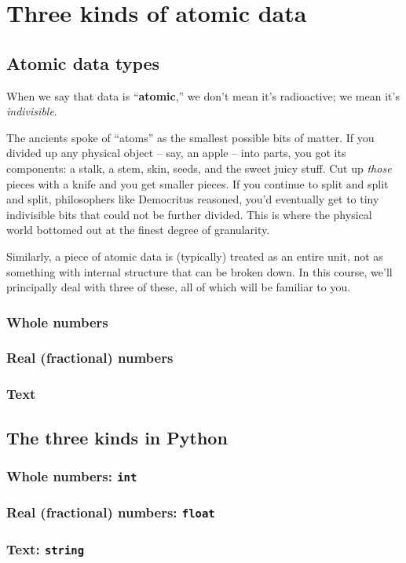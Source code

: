 
\chapter{Three kinds of atomic data}

\section{Atomic data types}

When we say that data is ``\textbf{atomic},'' we don't mean it's radioactive;
we mean it's \textit{indivisible}.

The ancients spoke of ``atoms'' as the smallest possible bits of matter. If you
divided up any physical object -- say, an apple -- into parts, you got its
components: a stalk, a stem, skin, seeds, and the sweet juicy stuff. Cut up
\textit{those} pieces with a knife and you get smaller pieces. If you continue
to split and split and split, philosophers like Democritus reasoned, you'd
eventually get to tiny indivisible bits that could not be further divided. This
is where the physical world bottomed out at the finest degree of granularity.

Similarly, a piece of atomic data is (typically) treated as an entire unit, not
as something with internal structure that can be broken down. In this course,
we'll principally deal with three of these, all of which will be familiar to
you.

\subsection{Whole numbers}

\subsection{Real (fractional) numbers}

\subsection{Text}

\section{The three kinds in Python}

\subsection{Whole numbers: \texttt{int}}

\subsection{Real (fractional) numbers: \texttt{float}}

\subsection{Text: \texttt{string}}

